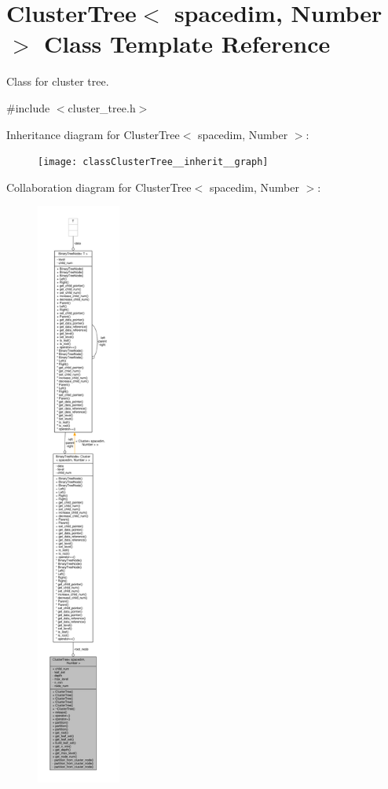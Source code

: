 \hypertarget{classClusterTree}{}\section{Cluster\+Tree$<$ spacedim, Number $>$ Class Template Reference}
\label{classClusterTree}


Class for cluster tree.  




{\ttfamily \#include $<$cluster\+\_\+tree.\+h$>$}



Inheritance diagram for Cluster\+Tree$<$ spacedim, Number $>$\+:\nopagebreak
\begin{figure}[H]
\begin{center}
\leavevmode
\texttt{[image: classClusterTree\_\_inherit\_\_graph]}
\end{center}
\end{figure}


Collaboration diagram for Cluster\+Tree$<$ spacedim, Number $>$\+:\nopagebreak
\begin{figure}[H]
\begin{center}
\leavevmode
\includegraphics[height=550pt]{classClusterTree__coll__graph}
\end{center}
\end{figure}
